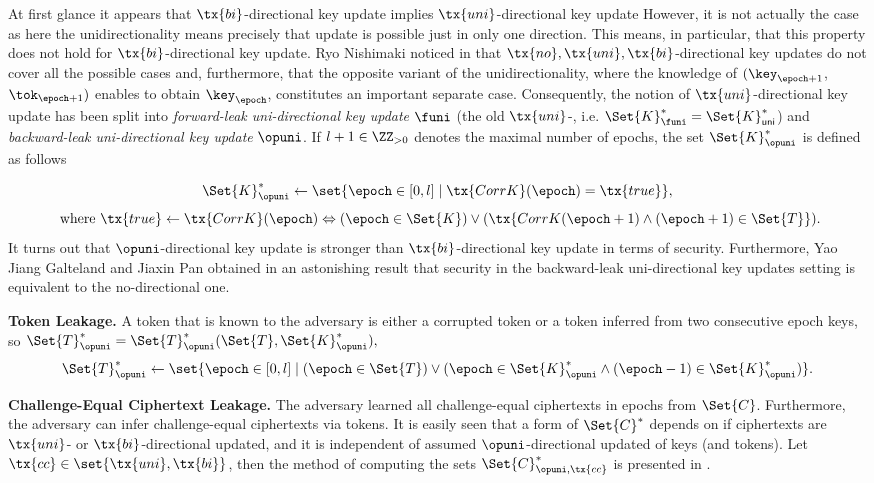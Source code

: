 \documentclass{fundam}
\begin{document}
At first glance it appears that $\tx{bi}$-directional key update implies $\tx{uni}$-directional key update However, it is not actually the case as here the unidirectionality means precisely that update is possible just in only one direction. This means, in particular, that this property does not hold for $\tx{bi}$-directional key update.  
Ryo Nishimaki noticed in \cite{nishimaki2022direction} that $\tx{no}, \tx{uni}, \tx{bi}$-directional key updates do not cover all the possible cases and, furthermore, that the opposite variant of the unidirectionality, where  the knowledge of $(\key_{\epoch+1}$, $\tok_{\epoch+1})$ enables to obtain $\key_{\epoch}$, constitutes an important separate case. %
Consequently, the notion of $\tx{uni}$-directional key update has been split into \textit{forward-leak uni-directional key update} $\funi$ (the old $\tx{uni}$-, i.e. $\Set{K}_{\funi}^{*}=\Set{K}_{\mathsf{uni}}^{*}$) and \textit{backward-leak uni-directional key update} $\opuni$. 
If $l+1\in \ZZ_{>0}$ denotes the maximal number of epochs, the set $\Set{K}_{\opuni}^{*}$ is defined as follows


$$\Set{K}_{\opuni}^{*}\gets \set{\epoch\in [0,l]\mid \tx{CorrK}(\epoch)=\tx{true}},$$ $$ \text{ where } \tx{true}\gets\tx{CorrK}(\epoch)\Leftrightarrow (\epoch \in\Set{K}) \lor (\tx{CorrK(\epoch +1 )\land (\epoch +1 )\in \Set{T}}).$$
It turns out that $\opuni$-directional key update is stronger than $\tx{bi}$-directional key update in terms of security. Furthermore, Yao Jiang Galteland and Jiaxin Pan obtained in \cite{jiang2023backward} an astonishing result that security in the backward-leak uni-directional key updates setting is equivalent to the no-directional one.

\vspace{0.1cm}
\noindent\textbf{Token Leakage.} A token that is known to the adversary is either a corrupted token or a token inferred from two consecutive epoch keys, so $\Set{T}_{\opuni}^{*} = \Set{T}_{\opuni}^{*} (\Set{T}, \Set{K}_{\opuni}^{*}),$
$$\Set{T}_{\opuni}^{*} \gets \set{\epoch\in [0,l]\mid  (\epoch \in \Set{T}) \lor (\epoch \in \Set{K}_{\opuni}^{*} \land (\epoch -1)\in  \Set{K}_{\opuni}^{*})  }.$$

\vspace{0.1cm}
\noindent\textbf{Challenge-Equal Ciphertext Leakage.} The adversary learned all challenge-equal ciphertexts in epochs from $\Set{C}$. Furthermore, the adversary can infer challenge-equal ciphertexts via tokens. It is easily seen that a form of $\Set{C}^{*}$ depends on if ciphertexts are $\tx{uni}$- or $\tx{bi}$-directional updated, and it is independent of assumed $\opuni$-directional updated of keys (and tokens). Let $\tx{cc}\in \set{\tx{uni}, \tx{bi}}$, then the method of computing the sets $\Set{C}_{\opuni, \tx{cc}}^{*}$ is presented in \cite{jiang2020}.
\end{document}
